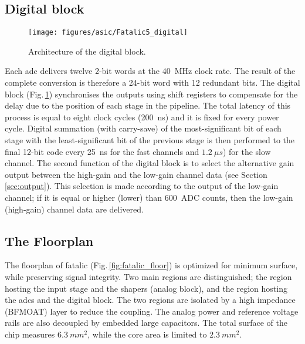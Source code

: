 
\subsection{Digital block}
\label{subsec:DigitalBlock}

\begin{figure}[tb]
\centering
\texttt{[image: figures/asic/Fatalic5\_digital]}
\caption{Architecture of the digital block.}
\label{bloc_digital2}
\end{figure}

Each \gls{adc} delivers twelve 2-bit words at the \SI{40}{MHz} clock rate. The result of the complete conversion is therefore 
a 24-bit word with 12 redundant bits. The digital block (Fig.\,\ref{bloc_digital2}) synchronises the outputs using shift 
registers to compensate for the delay due to the position of each stage in the pipeline. The total latency of this process is
equal to eight clock cycles (\SI{200}{ns}) and it is fixed for every power cycle. Digital summation (with carry-save) of the
most-significant bit of each stage with the least-significant bit of the previous stage is then performed to the final 12-bit 
code every \SI{25}{ns} for the fast channels and $\SI{1.2}{\mu s}$) for the slow channel. The second function of the digital block 
is to select the alternative gain output between the high-gain and the low-gain channel data (see Section\,\ref{sec:output}). 
This selection is made according to the output of the low-gain channel; if it is equal or higher (lower) than \SI{600}{ADC} counts, 
then the low-gain (high-gain) channel data are delivered.

\subsection{The Floorplan}

The floorplan of \gls{fatalic} (Fig.\,\ref{fig:fatalic_floor}) is optimized for minimum surface, while preserving signal 
integrity. Two main regions are distinguished; the region hosting the input stage and the shapers (analog block), and 
the region hosting the \glspl{adc} and the digital block. The two regions are isolated by a high impedance (BFMOAT) layer 
to reduce the coupling. The analog power and reference voltage rails are also decoupled by embedded large capacitors. The 
total surface of the chip measures $\SI{6.3}{mm^2}$, while the core area is limited to $\SI{2.3}{mm^2}$.

